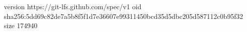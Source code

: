 version https://git-lfs.github.com/spec/v1
oid sha256:5dd69c82de7a5b8f5f1d7e36607e99311450bcd35d5dbc205d587112c0b95f32
size 174940
